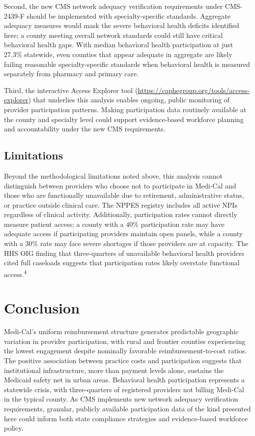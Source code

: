 \documentclass[12pt]{article}
\begin{document}
Second, the new CMS network adequacy verification requirements under CMS-2439-F should be implemented with specialty-specific standards. Aggregate adequacy measures would mask the severe behavioral health deficits identified here; a county meeting overall network standards could still have critical behavioral health gaps. With median behavioral health participation at just 27.3\% statewide, even counties that appear adequate in aggregate are likely failing reasonable specialty-specific standards when behavioral health is measured separately from pharmacy and primary care.

Third, the interactive Access Explorer tool (\url{https://caphegroup.org/tools/access-explorer}) that underlies this analysis enables ongoing, public monitoring of provider participation patterns. Making participation data routinely available at the county and specialty level could support evidence-based workforce planning and accountability under the new CMS requirements.

\subsection{Limitations}

Beyond the methodological limitations noted above, this analysis cannot distinguish between providers who choose not to participate in Medi-Cal and those who are functionally unavailable due to retirement, administrative status, or practice outside clinical care. The NPPES registry includes all active NPIs regardless of clinical activity. Additionally, participation rates cannot directly measure patient access; a county with a 40\% participation rate may have adequate access if participating providers maintain open panels, while a county with a 30\% rate may face severe shortages if those providers are at capacity. The HHS OIG finding that three-quarters of unavailable behavioral health providers cited full caseloads suggests that participation rates likely overstate functional access.\textsuperscript{4}


\section{Conclusion}

Medi-Cal's uniform reimbursement structure generates predictable geographic variation in provider participation, with rural and frontier counties experiencing the lowest engagement despite nominally favorable reimbursement-to-cost ratios. The positive association between practice costs and participation suggests that institutional infrastructure, more than payment levels alone, sustains the Medicaid safety net in urban areas. Behavioral health participation represents a statewide crisis, with three-quarters of registered providers not billing Medi-Cal in the typical county. As CMS implements new network adequacy verification requirements, granular, publicly available participation data of the kind presented here could inform both state compliance strategies and evidence-based workforce policy.
\end{document}
